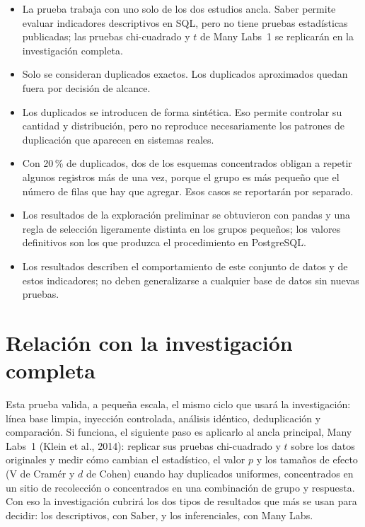 \documentclass[11pt,openany,oneside,letterpaper]{book}
\begin{document}
\begin{itemize}
 \item La prueba trabaja con uno solo de los dos estudios ancla. Saber permite evaluar indicadores descriptivos en SQL, pero no tiene pruebas estadísticas publicadas; las pruebas chi-cuadrado y $t$ de Many Labs~1 se replicarán en la investigación completa.
 \item Solo se consideran duplicados exactos. Los duplicados aproximados quedan fuera por decisión de alcance.
 \item Los duplicados se introducen de forma sintética. Eso permite controlar su cantidad y distribución, pero no reproduce necesariamente los patrones de duplicación que aparecen en sistemas reales.
 \item Con 20\,\% de duplicados, dos de los esquemas concentrados obligan a repetir algunos registros más de una vez, porque el grupo es más pequeño que el número de filas que hay que agregar. Esos casos se reportarán por separado.
 \item Los resultados de la exploración preliminar se obtuvieron con pandas y una regla de selección ligeramente distinta en los grupos pequeños; los valores definitivos son los que produzca el procedimiento en PostgreSQL.
 \item Los resultados describen el comportamiento de este conjunto de datos y de estos indicadores; no deben generalizarse a cualquier base de datos sin nuevas pruebas.
\end{itemize}

\section{Relación con la investigación completa}

Esta prueba valida, a pequeña escala, el mismo ciclo que usará la investigación: línea base limpia, inyección controlada, análisis idéntico, deduplicación y comparación. Si funciona, el siguiente paso es aplicarlo al ancla principal, Many Labs~1 (Klein et al., 2014): replicar sus pruebas chi-cuadrado y $t$ sobre los datos originales y medir cómo cambian el estadístico, el valor $p$ y los tamaños de efecto (V de Cramér y $d$ de Cohen) cuando hay duplicados uniformes, concentrados en un sitio de recolección o concentrados en una combinación de grupo y respuesta. Con eso la investigación cubrirá los dos tipos de resultados que más se usan para decidir: los descriptivos, con Saber, y los inferenciales, con Many Labs.
\end{document}
